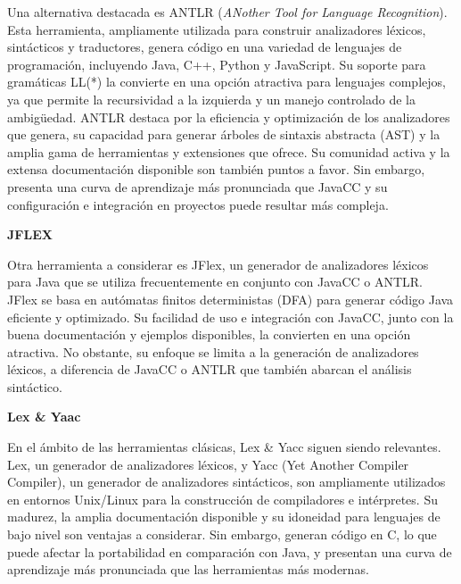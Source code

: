 \phantom{text}

Una alternativa destacada es ANTLR (\textit{ANother Tool for Language Recognition}). Esta herramienta, ampliamente utilizada para construir analizadores léxicos, sintácticos y traductores, genera código en una variedad de lenguajes de programación, incluyendo Java, C++, Python y JavaScript. Su soporte para gramáticas LL(*) la convierte en una opción atractiva para lenguajes complejos, ya que permite la recursividad a la izquierda y un manejo controlado de la ambigüedad. ANTLR destaca por la eficiencia y optimización de los analizadores que genera, su capacidad para generar árboles de sintaxis abstracta (AST) y la amplia gama de herramientas y extensiones que ofrece. Su comunidad activa y la extensa documentación disponible son también puntos a favor\cite{antlr}. Sin embargo, presenta una curva de aprendizaje más pronunciada que JavaCC y su configuración e integración en proyectos puede resultar más compleja.

\phantom{text}

\noindent \textbf{JFLEX}

\phantom{text}

Otra herramienta a considerar es JFlex, un generador de analizadores léxicos para Java que se utiliza frecuentemente en conjunto con JavaCC o ANTLR. JFlex se basa en autómatas finitos deterministas (DFA) para generar código Java eficiente y optimizado\cite{jflex}. Su facilidad de uso e integración con JavaCC, junto con la buena documentación y ejemplos disponibles, la convierten en una opción atractiva. No obstante, su enfoque se limita a la generación de analizadores léxicos, a diferencia de JavaCC o ANTLR que también abarcan el análisis sintáctico.

\phantom{text}

\noindent \textbf{Lex \& Yaac}

\phantom{text}

En el ámbito de las herramientas clásicas, Lex \& Yacc siguen siendo relevantes. Lex, un generador de analizadores léxicos, y Yacc (Yet Another Compiler Compiler), un generador de analizadores sintácticos, son ampliamente utilizados en entornos Unix/Linux para la construcción de compiladores e intérpretes. Su madurez, la amplia documentación disponible y su idoneidad para lenguajes de bajo nivel son ventajas a considerar\cite{lexandyacc}. Sin embargo, generan código en C, lo que puede afectar la portabilidad en comparación con Java, y presentan una curva de aprendizaje más pronunciada que las herramientas más modernas.

